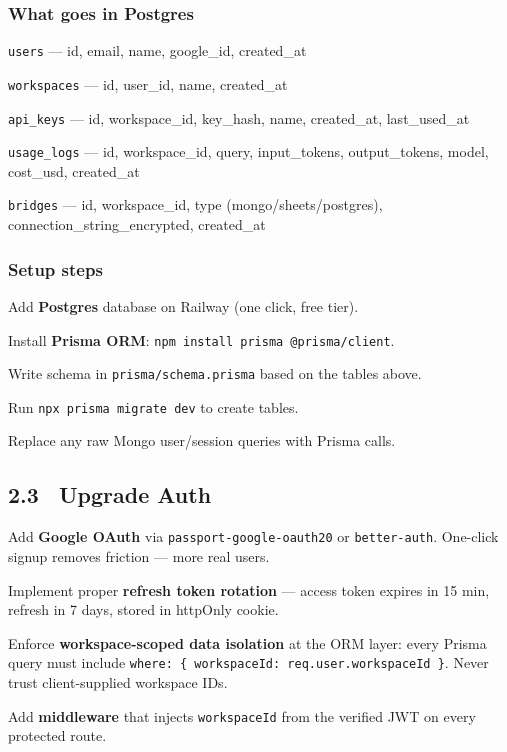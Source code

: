 \documentclass[11pt, a4paper]{article}
\DeclareRobustCommand{\badge}[2]{%
  \tikz[baseline=(n.base)]{
    \node[inner sep=3pt, rounded corners=3pt,
          fill=#1!15, text=#1!70!black,
          font=\fontsize{8}{8}\selectfont\bfseries] (n) {#2};
  }%
}
\DeclareRobustCommand{\critical}{\badge{danger}{CRITICAL}}
\begin{document}
\subsubsection{What goes in Postgres}
\begin{checklist}
  \item \texttt{users} — id, email, name, google\_id, created\_at
  \item \texttt{workspaces} — id, user\_id, name, created\_at
  \item \texttt{api\_keys} — id, workspace\_id, key\_hash, name, created\_at, last\_used\_at
  \item \texttt{usage\_logs} — id, workspace\_id, query, input\_tokens, output\_tokens, model, cost\_usd, created\_at
  \item \texttt{bridges} — id, workspace\_id, type (mongo/sheets/postgres), connection\_string\_encrypted, created\_at
\end{checklist}

\subsubsection{Setup steps}
\begin{checklist}
  \item Add \textbf{Postgres} database on Railway (one click, free tier).
  \item Install \textbf{Prisma ORM}: \texttt{npm install prisma @prisma/client}.
  \item Write schema in \texttt{prisma/schema.prisma} based on the tables above.
  \item Run \texttt{npx prisma migrate dev} to create tables.
  \item Replace any raw Mongo user/session queries with Prisma calls.
\end{checklist}

\subsection{2.3 \ Upgrade Auth \hfill \critical}

\begin{checklist}
  \item Add \textbf{Google OAuth} via \texttt{passport-google-oauth20} or \texttt{better-auth}. One-click signup removes friction — more real users.
  \item Implement proper \textbf{refresh token rotation} — access token expires in 15 min, refresh in 7 days, stored in httpOnly cookie.
  \item Enforce \textbf{workspace-scoped data isolation} at the ORM layer: every Prisma query must include \texttt{where: \{ workspaceId: req.user.workspaceId \}}. Never trust client-supplied workspace IDs.
  \item Add \textbf{middleware} that injects \texttt{workspaceId} from the verified JWT on every protected route.
\end{checklist}
\end{document}
